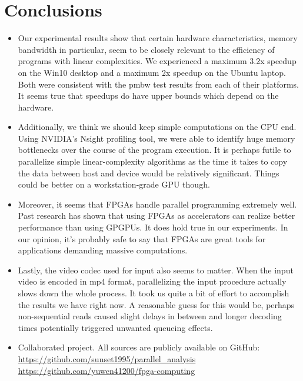 \documentclass{acm_proc_article-sp}
\begin{document}
\section{Conclusions}
\begin{itemize}
\item Our experimental results show that certain hardware characteristics, memory bandwidth in particular, seem to be closely relevant to the efficiency of programs with linear complexities. We experienced a maximum 3.2x speedup on the Win10 desktop and a maximum 2x speedup on the Ubuntu laptop. Both were consistent with the pmbw test results from each of their platforms. It seems true that speedups do have upper bounds which depend on the hardware.
\item Additionally, we think we should keep simple computations on the CPU end. Using NVIDIA's Nsight profiling tool, we were able to identify huge memory bottlenecks over the course of the program execution. It is perhaps futile to parallelize simple linear-complexity algorithms as the time it takes to copy the data between host and device would be relatively significant. Things could be better on a workstation-grade GPU though.
\item Moreover, it seems that FPGAs handle parallel programming extremely well. Past research has  shown that using FPGAs as accelerators can realize better performance than using GPGPUs. It does hold true in our experiments. In our opinion, it's probably safe to say that FPGAs are great tools for applications demanding massive computations.
\item Lastly, the video codec used for input also seems to matter. When the input video is encoded in mp4 format, parallelizing the input procedure actually slows down the whole process. It took us quite a bit of effort to accomplish the results we have right now. A reasonable guess for this would be, perhaps non-sequential reads caused slight delays in between and longer decoding times potentially triggered unwanted queueing effects.
\item Collaborated project. All sources are publicly available on GitHub: \\
\url{https://github.com/sunset1995/parallel_analysis} \\
\url{https://github.com/yuwen41200/fpga-computing}
\end{itemize}
\end{document}
